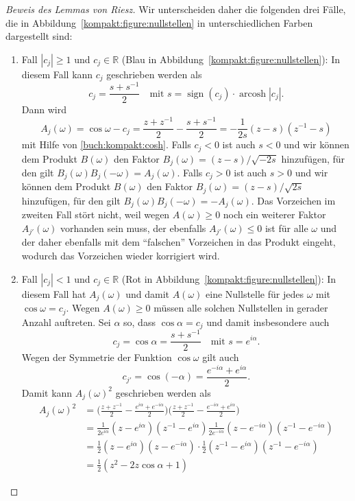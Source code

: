 \begin{proof}[Beweis des Lemmas von Riesz]
Wir unterscheiden daher die folgenden drei Fälle, die in
Abbildung~\ref{kompakt:figure:nullstellen} in unterschiedlichen Farben
dargestellt sind:
\begin{enumerate}
\item
Fall $|c_j|\ge 1$ und $c_j\in\mathbb R$ ({\color{blue}Blau} in
Abbildung~\ref{kompakt:figure:nullstellen}):
In diesem Fall kann $c_j$ geschrieben werden als
\[
c_j = \frac{s+s^{-1}}2
\quad
\text{mit $s=\operatorname{sign}(c_j)\cdot \operatorname{arcosh}|c_j|$.}
\]
Dann wird
\[
A_j(\omega)
=
\cos\omega - c_j
=
\frac{z+z^{-1}}2 - \frac{s+s^{-1}}2
=
-\frac1{2s} (z-s)(z^{-1}-s)
\]
mit Hilfe von \eqref{buch:kompakt:cosh}.
Falls $c_j < 0$ ist auch $s<0$ und wir können dem Produkt $B(\omega)$
den Faktor $B_j(\omega)=(z-s)/\sqrt{-2s}$ hinzufügen, für den gilt
$B_j(\omega)B_j(-\omega)=A_j(\omega)$.
Falls $c_j > 0$ ist auch $s>0$ und wir können dem Produkt $B(\omega)$
den Faktor $B_j(\omega) =(z-s)/\sqrt{2s}$ hinzufügen, für den
gilt $B_j(\omega)B_j(-\omega)=-A_j(\omega)$.
Das Vorzeichen im zweiten Fall stört nicht, weil wegen $A(\omega)\ge 0$
noch ein weiterer Faktor $A_{j'}(\omega)$ vorhanden sein muss, der ebenfalls
$A_{j'}(\omega)\le 0$ ist für alle $\omega$ und der daher ebenfalls
mit dem ``falschen'' Vorzeichen in das Produkt eingeht, wodurch das
Vorzeichen wieder korrigiert wird.
\item
Fall $|c_j| < 1$ und $c_j\in\mathbb R$ ({\color{red}Rot} in
Abbildung~\ref{kompakt:figure:nullstellen}):
In diesem Fall hat $A_j(\omega)$ und damit $A(\omega)$ eine Nullstelle
für jedes $\omega$ mit $\cos\omega=c_j$.
Wegen $A(\omega)\ge 0$ müssen alle solchen Nullstellen in gerader
Anzahl auftreten.
Sei $\alpha$ so, dass $\cos\alpha = c_j$ und damit insbesondere auch
\[
c_j
=
\cos\alpha
=
\frac{s+s^{-1}}2
\quad\text{mit $s=e^{i\alpha}$}.
\]
Wegen der Symmetrie der Funktion $\cos\omega$ gilt auch
\[
c_{j'}=
\cos(-\alpha)
=
\frac{e^{-i\alpha}+e^{i\alpha}}2.
\]
Damit kann $A_j(\omega)^2$ geschrieben werden als
\begin{align*}
A_j(\omega)^2
&=
\biggl(
\frac{z+z^{-1}}2-\frac{e^{i\alpha}+e^{-i\alpha}}2
\biggr)
\biggl(
\frac{z+z^{-1}}2-\frac{e^{-i\alpha}+e^{i\alpha}}2
\biggr)
\\
&=
\frac{1}{2e^{i\alpha}}
(z-e^{i\alpha})
(z^{-1}-e^{i\alpha})
\frac{1}{2e^{-i\alpha}}
(z-e^{-i\alpha})
(z^{-1}-e^{-i\alpha})
\\
&=
\frac{1}{2}
(z-e^{i\alpha})
(z-e^{-i\alpha})
\cdot
\frac{1}{2}
(z^{-1}-e^{i\alpha})
(z^{-1}-e^{-i\alpha})
\\
&=
\frac{1}{2}
(z^2-2z\cos\alpha +1)

\end{align*}
\end{enumerate}
\end{proof}
